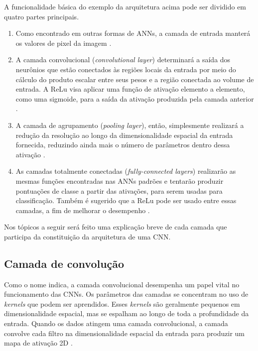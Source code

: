 \documentclass[
	12pt,				%
	oneside,			%
	a4paper,			%
	english,			%
	brazil				%
	]{abntex2ppgsi}
\begin{document}
A funcionalidade básica do exemplo da arquitetura acima pode ser dividido em quatro partes principais.

\begin{enumerate}
  \item Como encontrado em outras formas de ANNs, a camada de entrada manterá os valores de pixel da imagem \cite{o2015introduction}.
  
  \item A camada convolucional (\textit{convolutional layer}) determinará a saída dos neurônios que estão conectados às regiões locais da entrada por meio do cálculo do produto escalar entre seus pesos e a região conectada ao volume de entrada. A ReLu visa aplicar uma função de ativação elemento a elemento, como uma sigmoide, para a saída da ativação produzida pela camada anterior \cite{o2015introduction}.
  
  \item A camada de agrupamento (\textit{pooling layer}), então, simplesmente realizará a redução da resolução ao longo da dimensionalidade espacial da entrada fornecida, reduzindo ainda mais o número de parâmetros dentro dessa ativação \cite{o2015introduction}.
  
  \item As camadas totalmente conectadas (\textit{fully-connected layers}) realizarão as mesmas funções encontradas nas ANNs padrões e tentarão produzir pontuações de classe a partir das ativações, para serem usadas para classificação. Também é sugerido que a ReLu pode ser usado entre essas camadas, a fim de melhorar o desempenho \cite{o2015introduction}.
\end{enumerate}

Nos tópicos a seguir será feito uma explicação breve de cada camada que participa da constituição da arquitetura de uma CNN.

\subsection{Camada de convolução}

Como o nome indica, a camada convolucional desempenha um papel vital no funcionamento das CNNs. Os parâmetros das camadas se concentram no uso de \textit{kernels} que podem ser aprendidos. Esses \textit{kernels} são geralmente pequenos em dimensionalidade espacial, mas se espalham ao longo de toda a profundidade da entrada. Quando os dados atingem uma camada convolucional, a camada convolve cada filtro na dimensionalidade espacial da entrada para produzir um mapa de ativação 2D \cite{o2015introduction}.
\end{document}
